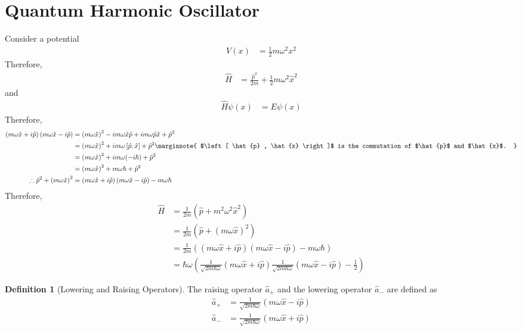 \documentclass[titlepage, fleqn, a4paper, 12pt, twoside]{article}
\theoremstyle{definition}
\newtheorem{definition}{Definition}
\theoremstyle{theorem}
\let\Oldsection\section
\renewcommand{\section}{\FloatBarrier\Oldsection}
\begin{document}
\section{Quantum Harmonic Oscillator}

Consider a potential
\begin{align*}
	V(x) &= \frac{1}{2} m \omega^2 x^2
\end{align*}
Therefore,
\begin{align*}
	\hat{H} &= \frac{\hat{p}^2}{2 m} + \frac{1}{2} m \omega^2 \hat{x}^2
\end{align*}
and
\begin{align*}
	\hat{H} \psi(x) &= E \psi(x)
\end{align*}
Therefore,
\begin{align*}
	\left( m \omega \hat{x} + i \hat{p} \right) \left( m \omega \hat{x} - i \hat{p} \right) &= \left( m \omega \hat{x} \right)^2 - i m \omega \hat{x} \hat{p} + i m \omega \hat{p} \hat{x} + \hat{p}^2\\
	&= \left( m \omega \hat{x} \right)^2 + i m \omega \left[ \hat{p} , \hat{x} \right] + \hat{p}^2
	\marginnote
	{
		$\left[ \hat{p} , \hat{x} \right]$ is the commutation of $\hat{p}$ and $\hat{x}$.
	}\\
	&= \left( m \omega \hat{x} \right)^2 + i m \omega (- i \hbar) + \hat{p}^2\\
	&= \left( m \omega \hat{x} \right)^2 + m \omega \hbar + \hat{p}^2\\
	\therefore \hat{p}^2 + \left( m \omega \hat{x} \right)^2 &= \left( m \omega \hat{x} + i \hat{p} \right) \left( m \omega \hat{x} - i \hat{p} \right) - m \omega \hbar
\end{align*}
Therefore,
\begin{align*}
	\hat{H} &= \frac{1}{2 m} \left( \hat{p} + m^2 \omega^2 \hat{x}^2 \right)\\
	&= \frac{1}{2 m} \left( \hat{p} + \left( m \omega \hat{x} \right)^2 \right)\\
	&= \frac{1}{2 m} \left( \left( m \omega \hat{x} + i \hat{p} \right) \left( m \omega \hat{x} - i \hat{p} \right) - m \omega \hbar \right)\\
	&= \hbar \omega \left( \frac{1}{\sqrt{2 m \hbar \omega}} \left( m \omega \hat{x} + i \hat{p} \right) \frac{1}{\sqrt{2 m \hbar \omega}} \left( m \omega \hat{x} - i \hat{p} \right) - \frac{1}{2} \right)
\end{align*}

\begin{definition}[Lowering and Raising Operators]
	The raising operator $\hat{a}_+$ and the lowering operator $\hat{a}_-$ are defined as
	\begin{align*}
		\hat{a}_+ &= \frac{1}{\sqrt{2 m \hbar \omega}} \left( m \omega \hat{x} - i \hat{p} \right)\\
		\hat{a}_- &= \frac{1}{\sqrt{2 m \hbar \omega}} \left( m \omega \hat{x} + i \hat{p} \right)
	\end{align*}
\end{definition}
\end{document}
